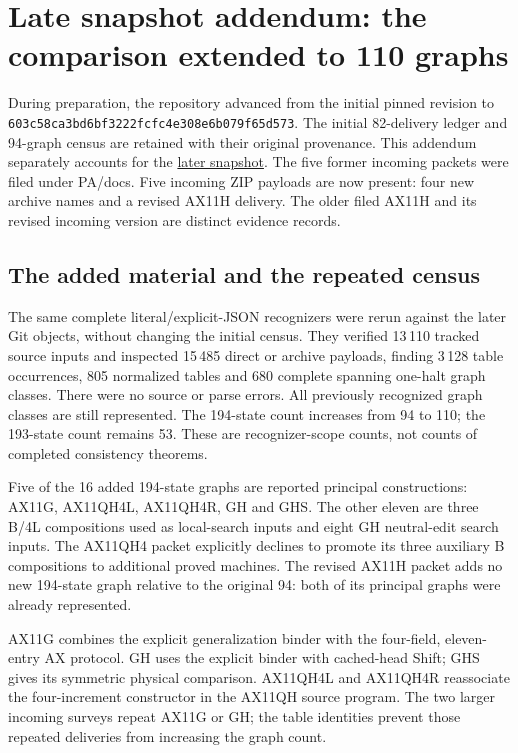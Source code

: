 \section{Late snapshot addendum: the comparison extended to 110 graphs}
\label{sec:late-snapshot}

During preparation, the repository advanced from the initial pinned
revision to
\nolinkurl{603c58ca3bd6bf3222fcfc4e308e6b079f65d573}.
The initial 82-delivery ledger and 94-graph census are retained with their
original provenance. This addendum separately accounts for the
\href{https://github.com/VladimirReshetnikov/ProveIt/tree/603c58ca3bd6bf3222fcfc4e308e6b079f65d573}{later snapshot}.
The five former incoming packets were filed under PA/docs. Five incoming
ZIP payloads are now present: four new archive names and a revised
AX11H delivery. The older filed AX11H and its revised incoming version
are distinct evidence records.

\subsection{The added material and the repeated census}

The same complete literal/explicit-JSON recognizers were rerun against
the later Git objects, without changing the initial census. They verified
13\,110 tracked source inputs and inspected 15\,485 direct or archive
payloads, finding 3\,128 table occurrences, 805 normalized tables and
680 complete spanning one-halt graph classes. There were no source or
parse errors. All previously recognized graph classes are still
represented. The 194-state count increases from 94 to 110; the 193-state
count remains 53. These are recognizer-scope counts, not counts of
completed consistency theorems.

Five of the 16 added 194-state graphs are reported principal constructions:
AX11G, AX11QH4L, AX11QH4R, GH and GHS. The other eleven are three B/4L
compositions used as local-search inputs and eight GH neutral-edit
search inputs. The AX11QH4 packet explicitly declines to promote its
three auxiliary B compositions to additional proved machines. The
revised AX11H packet adds no new 194-state graph relative to the
original 94: both of its principal graphs were already represented.



AX11G combines the explicit generalization binder with the four-field,
eleven-entry AX protocol. GH uses the explicit binder with cached-head
Shift; GHS gives its symmetric physical comparison. AX11QH4L and
AX11QH4R reassociate the four-increment constructor in the AX11QH
source program. The two larger incoming surveys repeat AX11G or GH;
the table identities prevent those repeated deliveries from increasing
the graph count.

